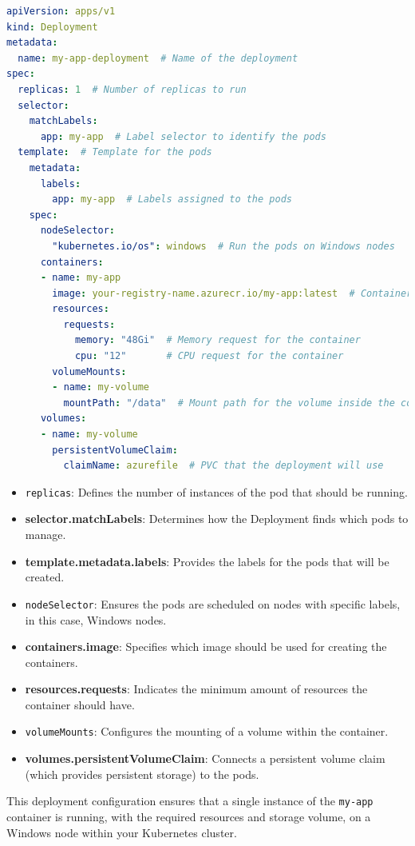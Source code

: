 \documentclass{article}
\begin{document}
\begin{lstlisting}[language=yaml]
apiVersion: apps/v1
kind: Deployment
metadata:
  name: my-app-deployment  # Name of the deployment
spec:
  replicas: 1  # Number of replicas to run
  selector:
    matchLabels:
      app: my-app  # Label selector to identify the pods
  template:  # Template for the pods
    metadata:
      labels:
        app: my-app  # Labels assigned to the pods
    spec:
      nodeSelector:
        "kubernetes.io/os": windows  # Run the pods on Windows nodes
      containers:
      - name: my-app
        image: your-registry-name.azurecr.io/my-app:latest  # Container image to deploy
        resources:
          requests:
            memory: "48Gi"  # Memory request for the container
            cpu: "12"       # CPU request for the container
        volumeMounts:
        - name: my-volume
          mountPath: "/data"  # Mount path for the volume inside the container
      volumes:
      - name: my-volume
        persistentVolumeClaim:
          claimName: azurefile  # PVC that the deployment will use
\end{lstlisting}

\begin{itemize}
    \item \texttt{replicas}: Defines the number of instances of the pod that should be running.
    \item \textbf{selector.matchLabels}: Determines how the Deployment finds which pods to manage.
    \item \textbf{template.metadata.labels}: Provides the labels for the pods that will be created.
    \item \texttt{nodeSelector}: Ensures the pods are scheduled on nodes with specific labels, in this case, Windows nodes.
    \item \textbf{containers.image}: Specifies which image should be used for creating the containers.
    \item \textbf{resources.requests}: Indicates the minimum amount of resources the container should have.
    \item \texttt{volumeMounts}: Configures the mounting of a volume within the container.
    \item \textbf{volumes.persistentVolumeClaim}: Connects a persistent volume claim (which provides persistent storage) to the pods.
\end{itemize}

This deployment configuration ensures that a single instance of the \texttt{my-app} container is running, with the required resources and storage volume, on a Windows node within your Kubernetes cluster.
\end{document}
